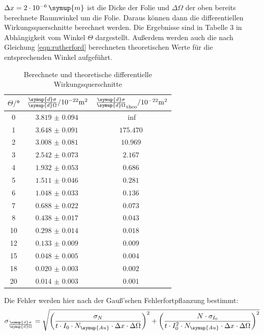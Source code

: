 $\Delta x = 2 \cdot 10^{-6} \, \symup{m}$ ist die Dicke der Folie und $\Delta \Omega$
der oben bereits berechnete Raumwinkel um die Folie. Daraus können dann die
differentiellen Wirkungsquerschnitte berechnet werden. Die Ergebnisse sind in Tabelle 3
in Abhängigkeit vom Winkel $\Theta$ dargestellt. Außerdem werden auch die nach
Gleichung \ref{eqn:rutherford} berechneten theoretischen Werte für die entsprechenden
Winkel aufgeführt.


\begin{table}[H]
  \centering
  \caption{Berechnete und theoretische differentielle Wirkungsquerschnitte}
  \label{tab:Parameter}
  \begin{tabular}{c c c}
    \toprule
    $\Theta/$° & $\frac{\symup{d}\sigma}{\symup{d}\Omega}/ \mathrm{10^{-22}m^2}$ & $\frac{\symup{d}\sigma}{\symup{d}\Omega}_{\mathrm{theo}}/ \mathrm{10^{-22}m^2}$ \\
    \midrule
     0  &  $\SI{3.819(94)}{}$ & inf \\
     1  &  $\SI{3.648(91)}{}$ & $\SI{175.470}{}$ \\
     2  &  $\SI{3.008(81)}{}$ & $\SI{10.969}{}$ \\
     3  &  $\SI{2.542(73)}{}$ & $\SI{2.167}{}$ \\
     4  &  $\SI{1.932(53)}{}$ & $\SI{0.686}{}$ \\
     5  &  $\SI{1.511(46)}{}$ & $\SI{0.281}{}$ \\
     6  &  $\SI{1.048(33)}{}$ & $\SI{0.136}{}$ \\
     7  &  $\SI{0.688(22)}{}$ & $\SI{0.073}{}$\\
     8  &  $\SI{0.438(17)}{}$ & $\SI{0.043}{}$\\
    10  &  $\SI{0.298(14)}{}$ & $\SI{0.018}{}$\\
    12  &  $\SI{0.133(9)}{}$  & $\SI{0.009}{}$\\
    15  &  $\SI{0.048(5)}{}$  & $\SI{0.004}{}$\\
    18  &  $\SI{0.020(3)}{}$  & $\SI{0.002}{}$\\
    20  &  $\SI{0.014(3)}{}$  & $\SI{0.001}{}$\\
      \bottomrule
  \end{tabular}
\end{table}

Die Fehler werden hier nach der Gauß'schen Fehlerfortpflanzung bestimmt:
\begin{equation*}
  \sigma_{\frac{\symup{d}\sigma}{\symup{d}\Omega}} = \sqrt{\left(\frac{\sigma_N}{t \cdot I_0 \cdot N_\symup{Au} \cdot \Delta x \cdot \Delta \Omega}\right)^2
  + \left(\frac{N \cdot \sigma_{I_0}}{t \cdot I_0^2 \cdot N_\symup{Au} \cdot \Delta x \cdot \Delta \Omega}\right)^2}
\end{equation*}

